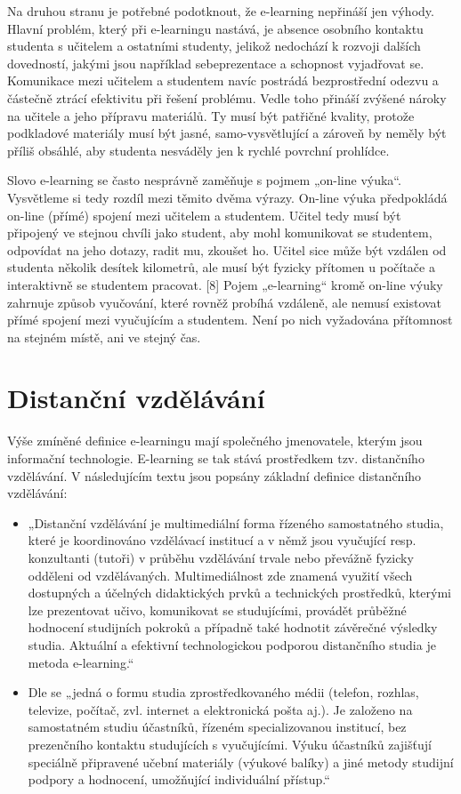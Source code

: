 \documentclass[
print,
  11pt,
  table,   
  nolof,    
  nolot,
  oneside,
  final
]{fithesis3}
\begin{document}
Na druhou stranu je potřebné podotknout, že e-learning nepřináší jen výhody. Hlavní problém, který při e-learningu nastává, je absence osobního kontaktu studenta s učitelem a ostatními studenty, jelikož nedochází k rozvoji dalších dovedností, jakými jsou například sebeprezentace a schopnost vyjadřovat se. Komunikace mezi učitelem a studentem navíc postrádá bezprostřední odezvu a částečně ztrácí efektivitu při řešení problému. Vedle toho přináší zvýšené nároky na učitele a jeho přípravu materiálů. Ty musí být patřičné kvality, protože podkladové materiály musí být jasné, samo-vysvětlující a zároveň by neměly být příliš obsáhlé, aby studenta nesváděly jen k rychlé povrchní prohlídce.

Slovo e-learning se často nesprávně zaměňuje s pojmem „on-line výuka“. Vysvětleme si tedy rozdíl mezi těmito dvěma výrazy. On-line výuka předpokládá on-line (přímé) spojení mezi učitelem a studentem. Učitel tedy musí být připojený ve stejnou chvíli jako student, aby mohl komunikovat se studentem, odpovídat na jeho dotazy, radit mu, zkoušet ho. Učitel sice může být vzdálen od studenta několik desítek kilometrů, ale musí být fyzicky přítomen u počítače a interaktivně se studentem pracovat. [8] Pojem „e-learning“ kromě on-line výuky zahrnuje způsob vyučování, které rovněž probíhá vzdáleně, ale nemusí existovat přímé spojení mezi vyučujícím a studentem. Není po nich vyžadována přítomnost na stejném místě, ani ve stejný čas.


	\section{Distanční vzdělávání}

Výše zmíněné definice e-learningu mají společného jmenovatele, kterým jsou informační technologie. E-learning se tak stává prostředkem tzv. distančního vzdělávání. V následujícím textu jsou popsány základní definice distančního vzdělávání: 

      \begin{itemize}
	\item „Distanční vzdělávání je multimediální forma řízeného samostatného studia, které je koordinováno vzdělávací institucí a v němž jsou vyučující resp. konzultanti (tutoři) v průběhu vzdělávání trvale nebo převážně fyzicky odděleni od vzdělávaných. Multimediálnost zde znamená využití všech dostupných a účelných didaktických prvků a technických prostředků, kterými lze prezentovat učivo, komunikovat se studujícími, provádět průběžné hodnocení studijních pokroků a případně také hodnotit závěrečné výsledky studia. Aktuální a efektivní technologickou podporou distančního studia je metoda e-learning.“ \cite{zlamalova} 
	\item Dle \cite{prucha} se „jedná o formu studia zprostředkovaného médii (telefon, rozhlas, televize, počítač, zvl. internet a elektronická pošta aj.). Je založeno na samostatném studiu účastníků, řízeném specializovanou institucí, bez prezenčního kontaktu studujících s vyučujícími. Výuku účastníků zajišťují speciálně připravené učební materiály (výukové balíky) a jiné metody studijní podpory a hodnocení, umožňující individuální přístup.“ 
     \end{itemize}
\end{document}

